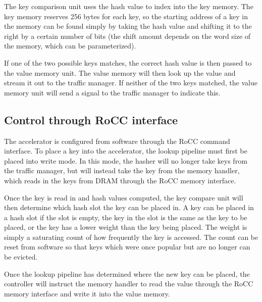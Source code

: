 \documentclass{article}
\begin{document}
The key comparison unit uses the hash value to index into the key memory.
The key memory reserves 256 bytes for each key, so the starting address of a
key in the memory can be found simply by taking the hash value and shifting it
to the right by a certain number of bits (the shift amount depends on the
word size of the memory, which can be parameterized).

If one of the two possible keys matches, the correct hash value is then passed
to the value memory unit. The value memory will then look up the value and
stream it out to the traffic manager. If neither of the two keys matched,
the value memory unit will send a signal to the traffic manager to indicate this.

\subsection{Control through RoCC interface}

The accelerator is configured from software through the RoCC command interface.
To place a key into the accelerator, the lookup pipeline must first be
placed into write mode. In this mode, the hasher will no longer take keys
from the traffic manager, but will instead take the key from the memory handler,
which reads in the keys from DRAM through the RoCC memory interface.

Once the key is read in and hash values computed, the key compare unit will
then determine which hash slot the key can be placed in. A key can be placed
in a hash slot if the slot is empty, the key in the slot is the same as the
key to be placed, or the key has a lower weight than the key being placed.
The weight is simply a saturating count of how frequently the key is accessed.
The count can be reset from software so that keys which were once popular but
are no longer can be evicted.

Once the lookup pipeline has determined where the new key can be placed, the
controller will instruct the memory handler to read the value through the
RoCC memory interface and write it into the value memory.
\end{document}
